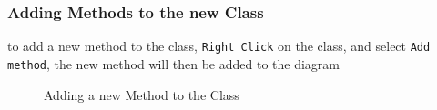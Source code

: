 \documentclass[a4paper]{article}
\begin{document}
\subsubsection{Adding Methods to the new Class}
to add a new method to the class, \texttt{Right Click} on the class, and select \texttt{Add method}, the new method will then be added to the diagram

\begin{figure}[H]
\begin{center}
 \imagespace
{}
\caption{Adding a new Method to the Class}
\end{center}
\end{figure}
\end{document}
